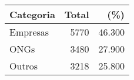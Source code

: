 \begin{tabular}{lrr}
\toprule
Categoria & Total & (\%) \\
\midrule
Empresas & 5770 & 46.300 \\
ONGs & 3480 & 27.900 \\
Outros & 3218 & 25.800 \\
\bottomrule
\end{tabular}

